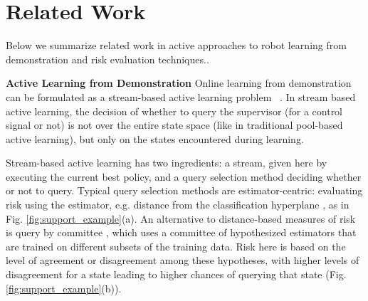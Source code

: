 \documentclass[10pt, conference]{ieeeconf}      %
\newcommand{\acro}{SHIV}
\begin{document}



\section{Related Work}
Below we summarize related work in active approaches to robot learning from demonstration and risk evaluation techniques.. 

\noindent\textbf{Active Learning from Demonstration}
Online learning from demonstration can be formulated as a stream-based active learning problem ~\cite{atlas1990training,cohn1994improving}. In stream based active learning, the decision of whether to query the supervisor (for a control signal or not) is not over the entire state space (like in traditional pool-based active learning), but only on the states encountered during learning. 

Stream-based active learning has two ingredients: a stream, given here by executing the current best policy, and a query selection method deciding whether or not to query. Typical query selection methods are estimator-centric:  evaluating risk using the estimator, e.g. distance from the classification hyperplane \cite{tong2002support}, as in Fig. \ref{fig:support_example}(a). An alternative to distance-based measures of  risk is query by committee  \cite{breiman1996bagging}, which uses a committee of hypothesized estimators that are trained on different subsets of the training data. Risk here is based on the level of agreement or disagreement among these hypotheses, with higher levels of disagreement for a state leading to higher chances of querying that state (Fig. \ref{fig:support_example}(b)).
\end{document}

